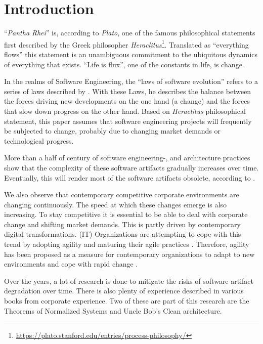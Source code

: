 \chapter{Introduction} \label{introduction}

\enquote{\emph{Pantha Rhei}} is, according to \emph{Plato}, one of the famous
philosophical statements first described by the Greek philosopher
\emph{Heraclitus}\footnote{\url{https://plato.stanford.edu/entries/process-philosophy/}}.
Translated as \enquote{everything flows} this statement is an unambiguous commitment to
the ubiquitous dynamics of everything that exists. \enquote{Life is flux}, one of the
constants in life, is change.

In the realms of Software Engineering, the \enquote{laws of software evolution}
\parencite[]{lehman_programs_1980} refers to a series of laws described by
\citeauthor{lehman_programs_1980}. With these Laws, he describes the balance between the
forces driving new developments on the one hand (a change) and the forces that slow down
progress on the other hand. Based on \emph{Heraclitus} philosophical statement, this paper
assumes that software engineering projects will frequently be subjected to change,
probably due to changing market demands or technological progress. 

More than a half of century of software engineering-, and architecture practices show that
the complexity of these software artifacts gradually increases over time. Eventually, this
will render most of the software artifacts obsolete, according to
\citeauthor{lehman_programs_1980} \parencite[]{lehman_programs_1980}.

We also observe that contemporary competitive corporate environments are changing
continuously. The speed at which these changes emerge is also increasing. To stay
competitive it is essential to be able to deal with corporate change and shifting market
demands. This is partly driven by
contemporary digital transformations. (IT) Organizations are attempting to cope with this
trend by adopting agility and maturing their agile practices
\parencite[]{2024_SIM_key_issues_and_trends}. Therefore, agility has been proposed as a
measure for contemporary organizations to adapt to new environments and cope with rapid
change \parencite[]{neumann_strategic_1994}.

Over the years, a lot of research is done to mitigate the risks of software artifact
degradation over time. There is also plenty of experience described in various books from
corporate experience. Two of these are part of this research are the Theorems of
Normalized Systems and Uncle Bob's Clean architecture.






